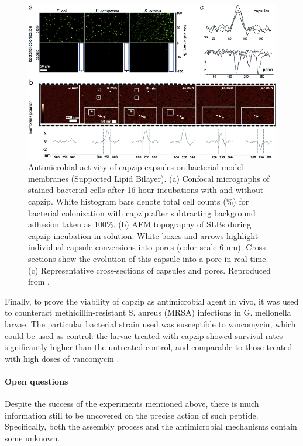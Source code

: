 \begin{figure}
\begin{center}
\includegraphics[width=0.8\linewidth, align = c]{1introduction/pics/AFM_on_SLB}
\caption[Capzip experiments on Supported Lipid Bilayers]{Antimicrobial activity of capzip capsules on bacterial model membranes (Supported Lipid Bilayer). (a) Confocal micrographs of stained bacterial cells after 16 hour incubations with and without capzip. White histogram bars denote total cell counts (\%) for bacterial colonization with capzip after subtracting background adhesion taken as 100\%. (b) AFM topography of SLBs during capzip incubation in solution. White boxes and arrows highlight individual capsule conversions into pores (color scale 6 nm). Cross sections show the evolution of this capsule into a pore in real time. (c) Representative cross-sections of capsules and pores. Reproduced from \citet{Castelletto2016}.} \label{fig:exp_SLB}
\end{center}
\end{figure}

Finally, to prove the viability of capzip as antimicrobial agent in vivo, it was used to counteract methicillin-resistant S. aureus (MRSA) infections in G. mellonella larvae. The particular bacterial strain used was susceptible to vancomycin, which could be used as control: the larvae treated with capzip showed survival rates significantly higher than the untreated control, and comparable to those treated with high doses of vancomycin \citep{Kepiro2019}.



\paragraph{Open questions} Despite the success of the experiments mentioned above, there is much information still to be uncovered on the precise action of such peptide. 
%
Specifically, both the assembly process and the antimicrobial mechanisms contain some unknown.

